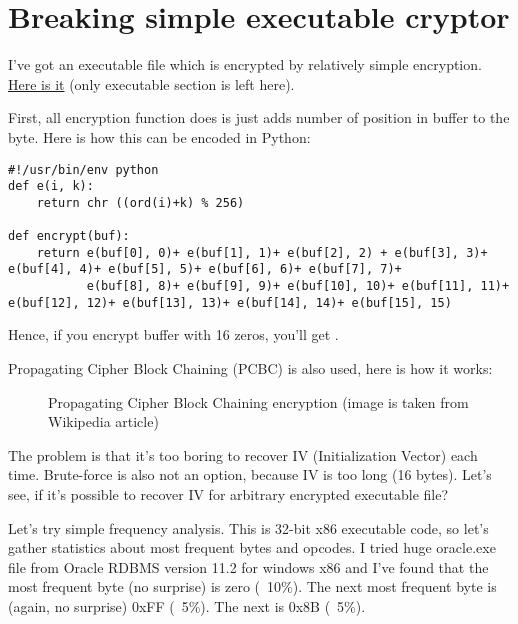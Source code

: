 \section{Breaking simple executable cryptor}

I've got an executable file which is encrypted by relatively simple encryption.
\href{https://github.com/dennis714/RE-for-beginners/blob/master/examples/simple_exec_crypto/files/cipher.bin}{Here is it} (only executable section is left here).

First, all encryption function does is just adds number of position in buffer to the byte.
Here is how this can be encoded in Python:

\begin{lstlisting}[caption=Python script,style=custompy]
#!/usr/bin/env python
def e(i, k):
    return chr ((ord(i)+k) % 256)

def encrypt(buf):
    return e(buf[0], 0)+ e(buf[1], 1)+ e(buf[2], 2) + e(buf[3], 3)+ e(buf[4], 4)+ e(buf[5], 5)+ e(buf[6], 6)+ e(buf[7], 7)+
           e(buf[8], 8)+ e(buf[9], 9)+ e(buf[10], 10)+ e(buf[11], 11)+ e(buf[12], 12)+ e(buf[13], 13)+ e(buf[14], 14)+ e(buf[15], 15)
\end{lstlisting}

Hence, if you encrypt buffer with 16 zeros, you'll get .

Propagating Cipher Block Chaining (PCBC) is also used, here is how it works:

\begin{figure}[H]
\centering
{}
\caption{Propagating Cipher Block Chaining encryption (image is taken from Wikipedia article)}
\end{figure}

The problem is that it's too boring to recover IV (Initialization Vector) each time.
Brute-force is also not an option, because IV is too long (16 bytes).
Let's see, if it's possible to recover IV for arbitrary encrypted executable file?

Let's try simple frequency analysis.
This is 32-bit x86 executable code, so let's gather statistics about most frequent bytes and opcodes.
I tried huge oracle.exe file from Oracle RDBMS version 11.2 for windows x86 and I've found that the most frequent byte (no surprise) is zero (~10\%).
The next most frequent byte is (again, no surprise) 0xFF (~5\%).
The next is 0x8B (~5\%).

